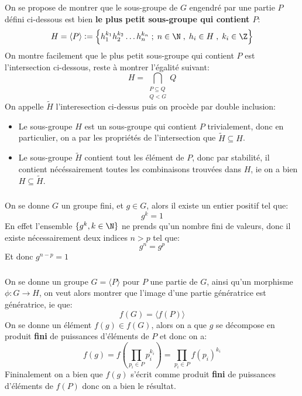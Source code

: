 \documentclass{report}
\begin{document}
   \chapter*{}
      \subsection*{}
         On se propose de montrer que le sous-groupe de \(G\) engendré par une partie \(P\) défini ci-dessous est bien \textbf{le plus petit sous-groupe qui contient \(P\)}:
         \[
            H = \langle P \rangle := \Bigl\{ h_1^{k_1}h_2^{k_2} \ldots h_n^{k_n}\; ; \; n \in \N \; , \; h_i \in H \; , \; k_i \in \Z \Bigl\}
         \]
         On montre facilement que le plus petit sous-groupe qui contient \(P\) est l'intersection ci-dessous, reste à montrer l'égalité suivant:
         \[
            H = \bigcap_{\substack{P \subseteq Q\\Q < G}} Q
         \]
         On appelle \(\widetilde{H}\) l'interesection ci-dessus puis on procède par double inclusion:
         \begin{itemize}
            \item Le sous-groupe \(H\) est un sous-groupe qui contient \(P\) trivialement, donc en particulier, on a par les propriétés de l'intersection que \(\widetilde{H} \subseteq H\).
            \item Le sous-groupe \(\widetilde{H}\) contient tout les élément de \(P\), donc par stabilité, il contient nécéssairement toutes les combinaisons trouvées dans \(H\), ie on a bien \(H \subseteq \widetilde{H}\).
         \end{itemize}
      \subsection*{}
      On se donne \(G\) un groupe fini, et \(g \in G\), alors il existe un entier positif tel que:
      \[
         g^k = 1
      \]
      En effet l'ensemble \(\{g^k, k \in \N\}\) ne prends qu'un nombre fini de valeurs, donc il existe nécessairement deux indices \(
      n > p\) tel que:
      \[
         g^{n} = g^{p}
      \]
      Et donc \(g^{n-p} = 1\)
      \subsection*{}
      On se donne un groupe \(G = \langle P \rangle \) pour \(P\) une partie de \(G\), ainsi qu'un morphisme \(\phi : G \longrightarrow H\), on veut alors montrer que l'image d'une partie génératrice est génératrice, ie que:
      \[
         f(G) = \langle f(P) \rangle
      \] 
      On se donne un élément \(f(g) \in  f(G)\), alors on a que \(g\) se décompose en produit \textbf{fini} de puissances d'éléments de \(P\) et donc on a:
      \[
         f(g) = f\left(\prod_{p_{i} \in P} p_i^{k_i}\right) = \prod_{p_{i} \in P} f(p_i)^{k_i}
      \]
      Fininalement on a bien que \(f(g)\) s'écrit comme produit \textbf{fini} de puissances d'éléments de \(f(P)\) donc on a bien le résultat.
\end{document}
